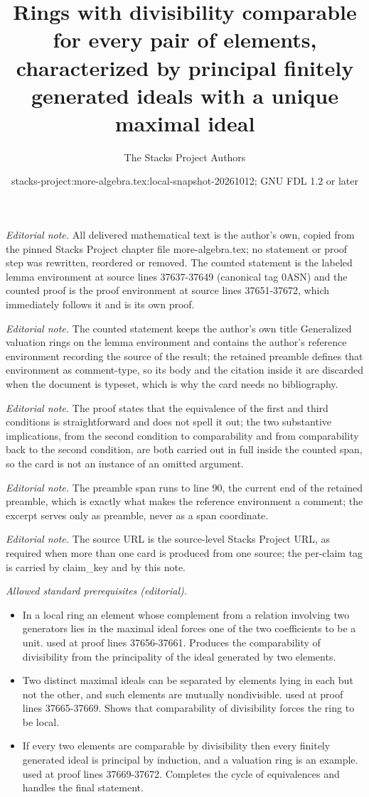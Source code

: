 \documentclass[10pt,a4paper]{amsart}
\title{Rings with divisibility comparable for every pair of elements, characterized by principal finitely generated ideals with a unique maximal ideal}
\author{The Stacks Project Authors}
\date{stacks-project:more-algebra.tex:local-snapshot-20261012; GNU FDL 1.2 or later}
\theoremstyle{plain}
\theoremstyle{definition}
\theoremstyle{remark}
\numberwithin{equation}{subsection}
\begin{document}
\maketitle
\setcounter{subsection}{1}
\noindent\textit{Editorial note.} All delivered mathematical text is the author's own, copied from the pinned Stacks Project chapter file more-algebra.tex; no statement or proof step was rewritten, reordered or removed. The counted statement is the labeled lemma environment at source lines 37637-37649 (canonical tag 0ASN) and the counted proof is the proof environment at source lines 37651-37672, which immediately follows it and is its own proof.\par\medskip
\noindent\textit{Editorial note.} The counted statement keeps the author's own title Generalized valuation rings on the lemma environment and contains the author's reference environment recording the source of the result; the retained preamble defines that environment as comment-type, so its body and the citation inside it are discarded when the document is typeset, which is why the card needs no bibliography.\par\medskip
\noindent\textit{Editorial note.} The proof states that the equivalence of the first and third conditions is straightforward and does not spell it out; the two substantive implications, from the second condition to comparability and from comparability back to the second condition, are both carried out in full inside the counted span, so the card is not an instance of an omitted argument.\par\medskip
\noindent\textit{Editorial note.} The preamble span runs to line 90, the current end of the retained preamble, which is exactly what makes the reference environment a comment; the excerpt serves only as preamble, never as a span coordinate.\par\medskip
\noindent\textit{Editorial note.} The source URL is the source-level Stacks Project URL, as required when more than one card is produced from one source; the per-claim tag is carried by claim\_key and by this note.\par\medskip
\noindent\textit{Allowed standard prerequisites (editorial).}\begin{itemize}
\item In a local ring an element whose complement from a relation involving two generators lies in the maximal ideal forces one of the two coefficients to be a unit. used at proof lines 37656-37661. Produces the comparability of divisibility from the principality of the ideal generated by two elements.
\item Two distinct maximal ideals can be separated by elements lying in each but not the other, and such elements are mutually nondivisible. used at proof lines 37665-37669. Shows that comparability of divisibility forces the ring to be local.
\item If every two elements are comparable by divisibility then every finitely generated ideal is principal by induction, and a valuation ring is an example. used at proof lines 37669-37672. Completes the cycle of equivalences and handles the final statement.
\end{itemize}\medskip
\end{document}
